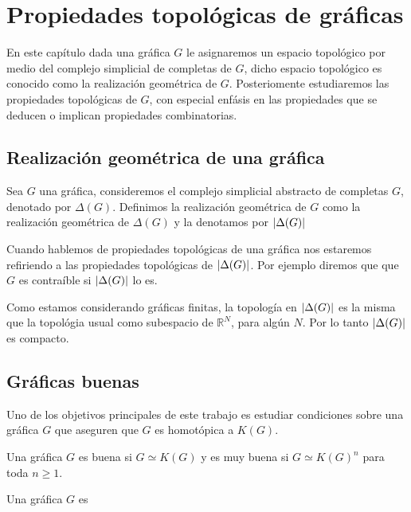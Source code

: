 \chapter{Propiedades topológicas de gráficas}
En este capítulo dada una gráfica $G$ le asignaremos un espacio topológico por medio del complejo simplicial de completas de $G$, dicho espacio topológico es conocido como la realización geométrica de $G$.
Posteriomente estudiaremos las propiedades topológicas de $G$, con especial enfásis en las propiedades que se deducen o implican propiedades combinatorias.

\section{Realización geométrica de una gráfica}
\begin{Defi}
Sea $G$ una gráfica, consideremos el complejo simplicial abstracto de completas $G$, denotado por $\Delta(G)$. Definimos la realización geométrica de $G$ como la realización geométrica de $\Delta(G)$ y la denotamos por $\left| \Delta(G) \right|$
\end{Defi}
Cuando hablemos de propiedades topológicas de una gráfica nos estaremos refiriendo a las propiedades topológicas de $\left| \Delta(G) \right|$. Por ejemplo diremos que que $G$ es contraíble si $\left| \Delta(G) \right|$ lo es.

Como estamos considerando gráficas finitas, la topología en $\left| \Delta(G) \right|$ es la misma que la topológia usual como subespacio de $\mathbb{R}^N$, para algún $N$. Por lo tanto $\left| \Delta(G) \right|$ es compacto.

\section{Gráficas buenas}
Uno de los objetivos principales de este trabajo es estudiar condiciones sobre una gráfica $G$ que aseguren que $G$ es homotópica a $K(G)$.
\begin{Defi}
Una gráfica $G$ es buena si $G\simeq K(G)$ y es muy buena si $G\simeq K(G)^n$ para toda $n\geq 1 $.
\end{Defi}

\begin{Defi}
Una gráfica $G$ es 
\end{Defi}


